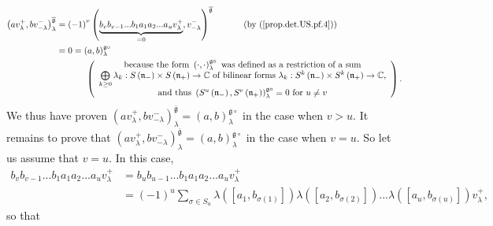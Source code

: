 \documentclass
[numbers=enddot,12pt,final,onecolumn,german,notitlepage]{scrartcl}%
\theoremstyle{definition}
\begin{document}
\begin{align*}
\left(  av_{\lambda}^{+},bv_{-\lambda}^{-}\right)  _{\lambda}^{\overline
{\mathfrak{g}}}  &  =\left(  -1\right)  ^{v}\left(  \underbrace{b_{v}%
b_{v-1}...b_{1}a_{1}a_{2}...a_{u}v_{\lambda}^{+}}_{=0},v_{-\lambda}%
^{-}\right)  ^{\overline{\mathfrak{g}}}\ \ \ \ \ \ \ \ \ \ \left(  \text{by
(\ref{prop.det.US.pf.4})}\right) \\
&  =0=\left(  a,b\right)  _{\lambda}^{\mathfrak{g}\circ}\\
&  \ \ \ \ \ \ \ \ \ \ \left(
\begin{array}
[c]{c}%
\text{because the form }\left(  \cdot,\cdot\right)  _{\lambda}^{\mathfrak{g}%
\circ}\text{ was defined as a restriction of a sum}\\
\bigoplus\limits_{k\geq0}\lambda_{k}:S\left(  \mathfrak{n}_{-}\right)  \times
S\left(  \mathfrak{n}_{+}\right)  \rightarrow\mathbb{C}\text{ of bilinear
forms }\lambda_{k}:S^{k}\left(  \mathfrak{n}_{-}\right)  \times S^{k}\left(
\mathfrak{n}_{+}\right)  \rightarrow\mathbb{C}\text{,}\\
\text{and thus }\left(  S^{u}\left(  \mathfrak{n}_{-}\right)  ,S^{v}\left(
\mathfrak{n}_{+}\right)  \right)  _{\lambda}^{\mathfrak{g}\circ}=0\text{ for
}u\neq v
\end{array}
\right)  .
\end{align*}
We thus have proven $\left(  av_{\lambda}^{+},bv_{-\lambda}^{-}\right)
_{\lambda}^{\overline{\mathfrak{g}}}=\left(  a,b\right)  _{\lambda
}^{\mathfrak{g}\circ}$ in the case when $v>u$. It remains to prove that
$\left(  av_{\lambda}^{+},bv_{-\lambda}^{-}\right)  _{\lambda}^{\overline
{\mathfrak{g}}}=\left(  a,b\right)  _{\lambda}^{\mathfrak{g}\circ}$ in the
case when $v=u$. So let us assume that $v=u$. In this case,%
\begin{align*}
b_{v}b_{v-1}...b_{1}a_{1}a_{2}...a_{u}v_{\lambda}^{+}  &  =b_{u}%
b_{u-1}...b_{1}a_{1}a_{2}...a_{u}v_{\lambda}^{+}\\
&  =\left(  -1\right)  ^{u}\sum\limits_{\sigma\in S_{u}}\lambda\left(  \left[
a_{1},b_{\sigma\left(  1\right)  }\right]  \right)  \lambda\left(  \left[
a_{2},b_{\sigma\left(  2\right)  }\right]  \right)  ...\lambda\left(  \left[
a_{u},b_{\sigma\left(  u\right)  }\right]  \right)  v_{\lambda}^{+},
\end{align*}
so that%
\end{document}
